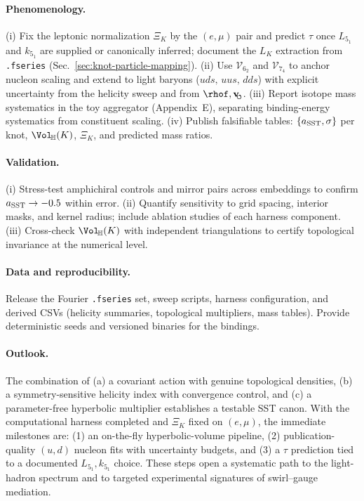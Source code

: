 \documentclass[11pt, preprint,titlepage]{revtex4-2}
\newcommand{\swirlarrow}{\!\!\scriptsize\boldsymbol{\circlearrowleft}}
\newcommand{\vswirl}{\mathbf{v}_{\swirlarrow}}
\begin{document}
    \paragraph{Phenomenology.}
    (i) Fix the leptonic normalization \(\Xi_K\) by the \((e,\mu)\) pair and predict \(\tau\) once \(L_{5_1}\) and \(k_{5_1}\) are supplied or canonically inferred; document the \(L_K\) extraction from \texttt{.fseries} (Sec.~\ref{sec:knot-particle-mapping}).
    (ii) Use \(\mathcal{V}_{6_2}\) and \(\mathcal{V}_{7_4}\) to anchor nucleon scaling and extend to light baryons (\(uds,\,uus,\,dds\)) with explicit uncertainty from the helicity sweep and from \(\rhof,\vswirl\).
    (iii) Report isotope mass systematics in the toy aggregator (Appendix~E), separating binding-energy systematics from constituent scaling.
    (iv) Publish falsifiable tables: \(\{a_{\rm SST},\sigma\}\) per knot, \(\Vol_{\!\mathbb{H}}(K)\), \(\Xi_K\), and predicted mass ratios.

    \paragraph{Validation.}
    (i) Stress-test amphichiral controls and mirror pairs across embeddings to confirm \(a_{\rm SST}\rightarrow -0.5\) within error.
    (ii) Quantify sensitivity to grid spacing, interior masks, and kernel radius; include ablation studies of each harness component.
    (iii) Cross-check \(\Vol_{\!\mathbb{H}}(K)\) with independent triangulations to certify topological invariance at the numerical level.

    \paragraph{Data and reproducibility.}
    Release the Fourier \texttt{.fseries} set, sweep scripts, harness configuration, and derived CSVs (helicity summaries, topological multipliers, mass tables). Provide deterministic seeds and versioned binaries for the bindings.

    \paragraph{Outlook.}
    The combination of (a) a covariant action with genuine topological densities, (b) a symmetry-sensitive helicity index with convergence control, and (c) a parameter-free hyperbolic multiplier establishes a testable SST canon. With the computational harness completed and \(\Xi_K\) fixed on \((e,\mu)\), the immediate milestones are: (1) an on-the-fly hyperbolic-volume pipeline, (2) publication-quality \((u,d)\) nucleon fits with uncertainty budgets, and (3) a \(\tau\) prediction tied to a documented \(L_{5_1},k_{5_1}\) choice. These steps open a systematic path to the light-hadron spectrum and to targeted experimental signatures of swirl–gauge mediation.
\end{document}
